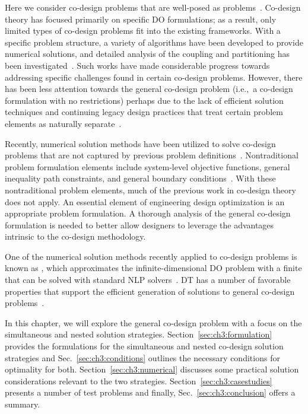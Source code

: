 Here we consider co-design problems that are well-posed as  problems~\cite{Fathy2001a, Allison2014a, Herber2014a}.
Co-design theory has focused primarily on specific DO formulations; as a result, only limited types of co-design problems fit into the existing frameworks.
With a specific problem structure, a variety of algorithms have been developed to provide numerical solutions, and detailed analysis of the coupling and partitioning has been investigated~\cite{Fathy2001a, Frischknecht2011a, Reyer2001a, Hale1985a, Eastep1987a, Sunar1993a, Peters2011a, Peters2009a}.
Such works have made considerable progress towards addressing specific challenges found in certain co-design problems.
However, there has been less attention towards the general co-design problem (i.e.,~a co-design formulation with no restrictions) perhaps due to the lack of efficient solution techniques and continuing legacy design practices that treat certain problem elements as naturally separate~\cite{Allison2014a}. 

Recently, numerical solution methods have been utilized to solve co-design problems that are not captured by previous problem definitions~\cite{Allison2014a, Herber2014a}.
Nontraditional problem formulation elements include system-level objective functions, general inequality path constraints, and general boundary conditions~\cite{Allison2013d, Allison2014b, Deshmukh2016a, Fathy2003a, Herber2013a, Maraniello2016a, Yan2009a, Chilan2017a}.
With these nontraditional problem elements, much of the previous work in co-design theory does not apply.
An essential element of engineering design optimization is an appropriate problem formulation.
A thorough analysis of the general co-design formulation is needed to better allow designers to leverage the advantages intrinsic to the co-design methodology.

One of the numerical solution methods recently applied to co-design problems is known as , which approximates the infinite-dimensional DO problem with a finite  that can be solved with standard NLP solvers~\cite{Betts2010a, Biegler2010a, Rao2010a, Allison2014b}. 
DT has a number of favorable properties that support the efficient generation of solutions to general co-design problems~\cite{Allison2014a, Allison2014b, Herber2014a}.

In this chapter, we will explore the general co-design problem with a focus on the simultaneous and nested solution strategies.
Section~\ref{sec:ch3:formulation} provides the formulations for the simultaneous and nested co-design solution strategies and Sec.~\ref{sec:ch3:conditions} outlines the necessary conditions for optimality for both.
Section~\ref{sec:ch3:numerical} discusses some practical solution considerations relevant to the two strategies.
Section~\ref{sec:ch3:casestudies} presents a number of test problems and finally, Sec.~\ref{sec:ch3:conclusion} offers a summary.

